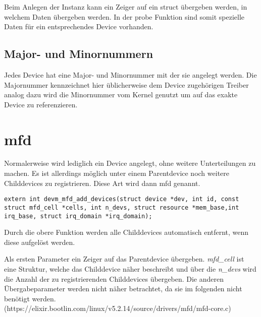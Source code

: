 Beim Anlegen der Instanz kann ein Zeiger auf ein struct übergeben werden, in welchem Daten übergeben werden. In der probe Funktion sind somit spezielle Daten für ein entsprechendes Device vorhanden. \cite{corbetplatform} 


\subsection{Major- und Minornummern}\label{sec:mmnum_t}
Jedes Device hat eine Major- und Minornummer mit der sie angelegt werden.
Die Majornummer kennzeichnet hier üblicherweise dem Device zugehörigen Treiber analog dazu wird die Minornummer vom Kernel genutzt um auf das exakte Device zu referenzieren. \citep[S. 43f]{corbet2005linux} 


\section{\acl{mfd}}\label{sec:mfd_t}
Normalerweise wird lediglich ein Device angelegt, ohne weitere Unterteilungen zu machen. Es ist allerdings möglich unter einem Parentdevice noch weitere Childdevices zu registrieren. Diese Art wird dann \acf{mfd} genannt.

\begin{lstlisting}
extern int devm_mfd_add_devices(struct device *dev, int id, const struct mfd_cell *cells, int n_devs, struct resource *mem_base,int irq_base, struct irq_domain *irq_domain);
\end{lstlisting}


Durch die obere Funktion werden alle Childdevices automatisch entfernt, wenn diese aufgelöst werden.

Als ersten Parameter ein Zeiger auf das Parentdevice übergeben. \textit{mfd\_cell} ist eine Struktur, welche das Childdevice näher beschreibt und über die \textit{n\_devs} wird die Anzahl der zu registrierenden Childdevices übergeben. Die anderen Übergabeparameter werden nicht näher betrachtet, da sie im folgenden nicht benötigt werden. 
(https://elixir.bootlin.com/linux/v5.2.14/source/drivers/mfd/mfd-core.c)




